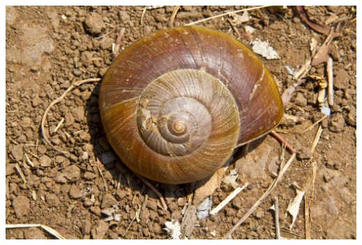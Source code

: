 \documentclass[a4paper,ngerman,twoside]{scrartcl}
\begin{document}
\thispagestyle{empty}

\vfill
\begin{center}\includegraphics[scale=0.3]{goldene-spirale-8}\end{center}
\end{document}
